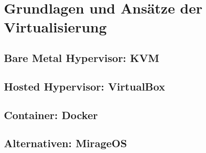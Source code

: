 \section{Grundlagen und Ansätze der Virtualisierung}

\subsection{Bare Metal Hypervisor: KVM}

\subsection{Hosted Hypervisor: VirtualBox}

\subsection{Container: Docker}

\subsection{Alternativen: MirageOS}
